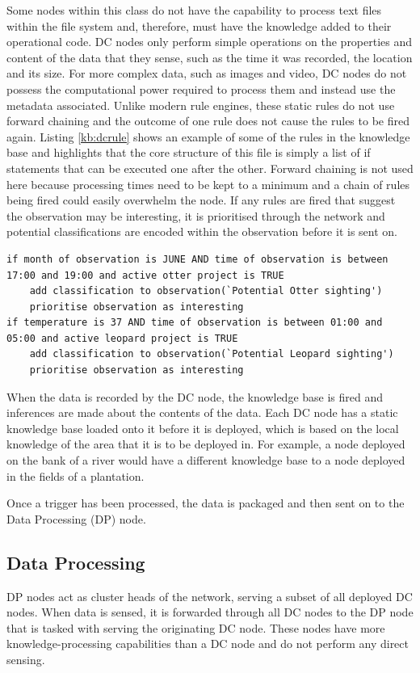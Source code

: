 	Some nodes within this class do not have the capability to process text files within the file system and, therefore, must have the knowledge added to their operational code. DC nodes only perform simple operations on the properties and content of the data that they sense, such as the time it was recorded, the location and its size. For more complex data, such as images and video, DC nodes do not possess the computational power required to process them and instead use the metadata associated.
	Unlike modern rule engines, these static rules do not use forward chaining and the outcome of one rule does not cause the rules to be fired again. Listing \ref{kb:dcrule} shows an example of some of the rules in the knowledge base and highlights that the core structure of this file is simply a list of if statements that can be executed one after the other. Forward chaining is not used here because processing times need to be kept to a minimum and a chain of rules being fired could easily overwhelm the node. If any rules are fired that suggest the observation may be interesting, it is prioritised through the network and potential classifications are encoded within the observation before it is sent on.

\begin{lstlisting}[breaklines=true, caption={Pseudocode DC Node Rules}, label={kb:dcrule}]
if month of observation is JUNE AND time of observation is between 17:00 and 19:00 and active otter project is TRUE
	add classification to observation(`Potential Otter sighting')
	prioritise observation as interesting
if temperature is 37 AND time of observation is between 01:00 and 05:00 and active leopard project is TRUE
	add classification to observation(`Potential Leopard sighting')
	prioritise observation as interesting
\end{lstlisting}

When the data is recorded by the DC node, the knowledge base is fired and inferences are made about the contents of the data. Each DC node has a static knowledge base loaded onto it before it is deployed, which is based on the local knowledge of the area that it is to be deployed in.  For example, a node deployed on the bank of a river would have a different knowledge base to a node deployed in the fields of a plantation.

Once a trigger has been processed, the data is packaged and then sent on to the Data Processing (DP) node.

	\subsection{Data Processing}\label{khas:dp}
	DP nodes act as cluster heads of the network, serving a subset of all deployed DC nodes. When data is sensed, it is forwarded through all DC nodes to the DP node that is tasked with serving the originating DC node. These nodes have more knowledge-processing capabilities than a DC node and do not perform any direct sensing. 

